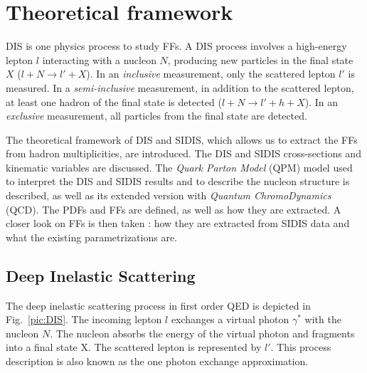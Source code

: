 
\chapter{Theoretical framework} %

\label{ch:thfw} %


DIS is one physics process to study FFs. A DIS process involves a high-energy lepton $l$ interacting with a nucleon $N$, producing new particles in the final state $X$ ($l+N \rightarrow l'+X$). In an \textit{inclusive} measurement, only the scattered lepton $l'$ is measured. In a \textit{semi-inclusive} measurement, in addition to the scattered lepton, at least one hadron of the final state is detected ($l+N \rightarrow l'+h+X$). In an \textit{exclusive} measurement, all particles from the final state are detected.

The theoretical framework of DIS and SIDIS, which allows us to extract the FFs from hadron multiplicities, are introduced. The DIS and SIDIS cross-sections and kinematic variables are discussed. The \textit{Quark Parton Model} (QPM) model used to interpret the DIS and SIDIS results and to describe the nucleon structure is described, as well as its extended version with \textit{Quantum ChromoDynamics} (QCD). The PDFs and FFs are defined, as well as how they are extracted. A closer look on FFs is then taken : how they are extracted from SIDIS data and what the existing parametrizations are.

\section{Deep Inelastic Scattering}

The deep inelastic scattering process in first order QED is depicted in Fig.~\ref{pic:DIS}. The incoming lepton $l$ exchanges a virtual photon $\gamma^*$ with the nucleon $N$. The nucleon absorbs the energy of the virtual photon and fragments into a final state X. The scattered lepton is represented by $l'$. This process description is also known as the one photon exchange approximation.

